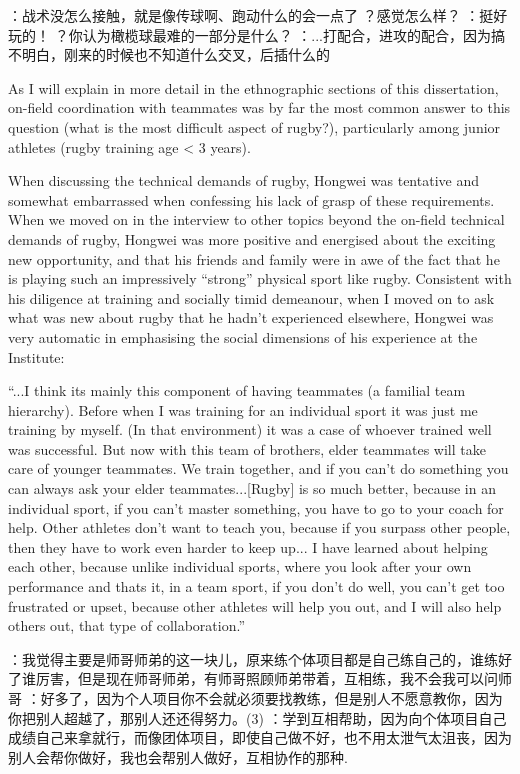 ：战术没怎么接触，就是像传球啊、跑动什么的会一点了
？感觉怎么样？
：挺好玩的！
？你认为橄榄球最难的一部分是什么？
：...打配合，进攻的配合，因为搞不明白，刚来的时候也不知道什么交叉，后插什么的

As I will explain in more detail in the ethnographic sections of this dissertation, on-field coordination with teammates was by far the most common answer to this question (what is the most difficult aspect of rugby?), particularly among junior athletes (rugby training age < 3 years).

When discussing the technical demands of rugby, Hongwei was tentative and somewhat embarrassed when confessing his lack of grasp of these requirements. When we moved on in the interview to other topics beyond the on-field technical demands of rugby, Hongwei was more positive and energised about the exciting new opportunity, and that his friends and family were in awe of the fact that he is playing such an impressively ``strong'' physical sport like rugby.  Consistent with his diligence at training and socially timid demeanour, when I moved on to ask what was new about rugby that he hadn't experienced elsewhere, Hongwei was very automatic in emphasising the social dimensions of his experience at the Institute:

``...I think its mainly this component of having teammates (a familial team hierarchy). Before when I was training for an individual sport it was just me training by myself. (In that environment) it was a case of whoever trained well was successful.  But now with this team of brothers, elder teammates will take care of younger teammates. We train together, and if you can’t do something you can always ask your elder teammates...[Rugby] is so much better, because in an individual sport, if you can’t master something, you have to go to your coach for help. Other athletes don’t want to teach you, because if you surpass other people, then they have to work even harder to keep up... I have learned about helping each other, because unlike individual sports, where you look after your own performance and thats it, in a team sport, if you don’t do well, you can’t get too frustrated or upset, because other athletes will help you out, and I will also help others out, that type of collaboration.''

：我觉得主要是师哥师弟的这一块儿，原来练个体项目都是自己练自己的，谁练好了谁厉害，但是现在师哥师弟，有师哥照顾师弟带着，互相练，我不会我可以问师哥
：好多了，因为个人项目你不会就必须要找教练，但是别人不愿意教你，因为你把别人超越了，那别人还还得努力。(3) ：学到互相帮助，因为向个体项目自己成绩自己来拿就行，而像团体项目，即使自己做不好，也不用太泄气太沮丧，因为别人会帮你做好，我也会帮别人做好，互相协作的那种.


